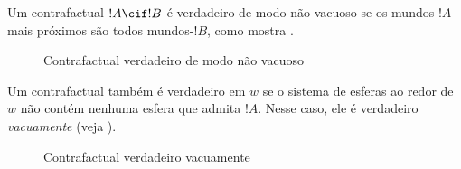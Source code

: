 \documentclass[../../../include/open-logic-section]{subfiles}
\begin{document}


Um contrafactual $!A \cif !B$ é verdadeiro de modo não vacuoso se os
mundos-$!A$ mais próximos são todos mundos-$!B$, como mostra .
\begin{figure}
\begin{center}
\caption{Contrafactual verdadeiro de modo não vacuoso}
\end{center}
\end{figure}
Um contrafactual também é verdadeiro em $w$ se o sistema de esferas
ao redor de~$w$ não contém nenhuma esfera que admita $!A$. Nesse caso, ele é
verdadeiro \emph{vacuamente} (veja ).
\begin{figure}
\begin{center}
\caption{Contrafactual verdadeiro vacuamente}
\end{center}
\end{figure}
\end{document}
